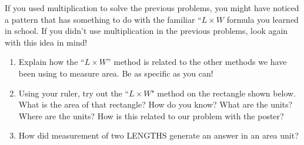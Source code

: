\documentclass[nooutcomes,handout,noauthor]{ximera}
\begin{document}
\newpage

\begin{problem}
If you used multiplication to solve the previous problems, you might have noticed a pattern that has something to do with the familiar ``$L \times W$ formula you learned in school. If you didn't use multiplication in the previous problems, look again with this idea in mind!
\begin{enumerate} 
\item Explain how the ``$L \times W$'' method is related to the other methods we have been using to measure area. Be as specific as you can!
\item Using your ruler, try out the ``$L \times W$" method on the rectangle shown below.  What is the area of that rectangle?  How do you know?  What are the units? Where are the units? How is this related to our problem with the poster?

\begin{image}
\end{image}


\item How did measurement of two LENGTHS generate an answer in an area unit?
\end{enumerate}
\end{problem}

\newpage
\end{document}
